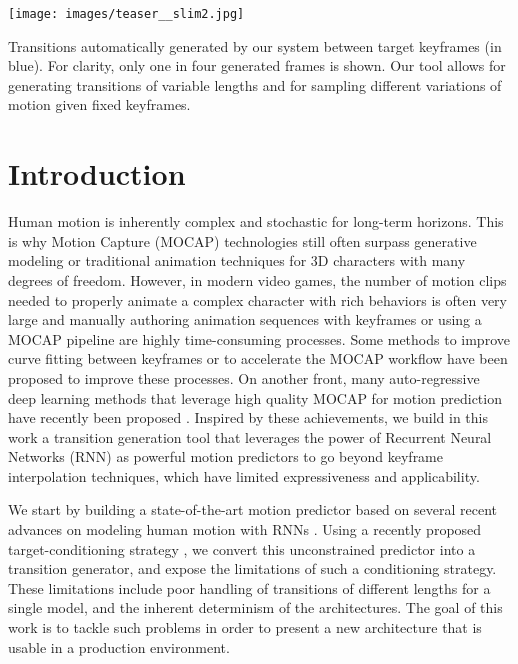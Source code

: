 \documentclass[acmtog]{acmart}
\begin{document}

\begin{teaserfigure}
  \texttt{[image: images/teaser\_\_slim2.jpg]}
  \caption{Transitions automatically generated by our system between target keyframes (in blue). For clarity, only one in four generated frames is shown. Our tool allows for generating transitions of variable lengths and for sampling different variations of motion given fixed keyframes.}
  \label{fig:teaser}
\end{teaserfigure}

\maketitle

\section{Introduction}
Human motion is inherently complex and stochastic for long-term horizons. This is why Motion Capture (MOCAP) technologies still often surpass generative modeling or traditional animation techniques for 3D characters with many degrees of freedom. However, in modern video games, the number of motion clips needed to properly animate a complex character with rich behaviors is often very large and manually authoring animation sequences with keyframes or using a MOCAP pipeline are highly time-consuming processes. Some methods to improve curve fitting between keyframes \cite{Ciccone:2019:TOI:3306346.3322938} or to accelerate the MOCAP workflow \cite{holden2018robust} have been proposed to improve these processes. On another front, many auto-regressive deep learning methods that leverage high quality MOCAP for motion prediction have recently been proposed \cite{fragkiadaki2015recurrent, jain2016structural, martinez2017human, barsoum2018hp, pavllo2019modeling, gopalakrishnan2019neural, chiu2019action}. Inspired by these achievements, we build in this work a transition generation tool that leverages the power of Recurrent Neural Networks (RNN) as powerful motion predictors to go beyond keyframe interpolation techniques, which have limited expressiveness and applicability.

We start by building a state-of-the-art motion predictor based on several recent advances on modeling human motion with RNNs \cite{fragkiadaki2015recurrent, chiu2019action, pavllo2019modeling}. Using a recently proposed target-conditioning strategy \cite{harvey2018recurrent}, we convert this unconstrained predictor into a transition generator, and expose the limitations of such a conditioning strategy. These limitations include poor handling of transitions of different lengths for a single model, and the inherent determinism of the architectures. The goal of this work is to tackle such problems in order to present a new architecture that is usable in a production environment.
\end{document}

